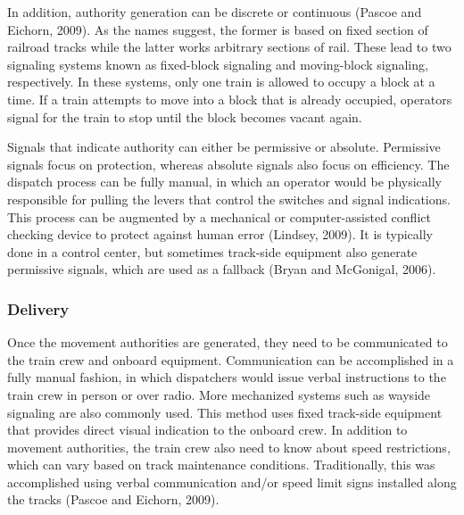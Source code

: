 \documentclass[11pt, titlepage]{article}
\begin{document}
In addition, authority generation can be discrete or continuous (Pascoe and Eichorn,
2009). As the names suggest, the former is based on fixed section of railroad
tracks while the latter works arbitrary sections of rail. These lead to two
signaling systems known as fixed-block signaling and moving-block signaling,
respectively. In these systems, only one train is allowed to occupy a block at a
time. If a train attempts to move into a block that is already occupied, operators
signal for the train to stop until the block becomes vacant again.

Signals that indicate authority can either be permissive or absolute. Permissive
signals focus on protection, whereas absolute signals also focus on efficiency. The
dispatch process can be fully manual, in which an operator would be physically
responsible for pulling the levers that control the switches and signal
indications. This process can be augmented by a mechanical or computer-assisted
conflict checking device to protect against human error (Lindsey, 2009). It is
typically done in a control center, but sometimes track-side equipment also
generate permissive signals, which are used as a fallback (Bryan and McGonigal,
2006).

\subsubsection{Delivery}

Once the movement authorities are generated, they need to be communicated to the
train crew and onboard equipment. Communication can be accomplished in a fully
manual fashion, in which dispatchers would issue verbal instructions to the train
crew in person or over radio. More mechanized systems such as wayside signaling are
also commonly used. This method uses fixed track-side equipment that provides
direct visual indication to the onboard crew. In addition to movement authorities,
the train crew also need to know about speed restrictions, which can vary based on
track maintenance conditions. Traditionally, this was accomplished using verbal
communication and/or speed limit signs installed along the tracks (Pascoe and
Eichorn, 2009).
\end{document}
